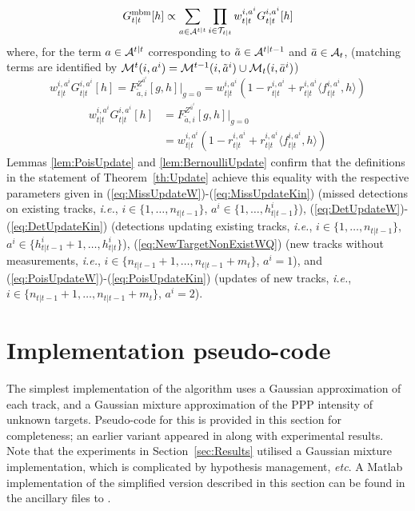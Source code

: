 \documentclass[journal,twoside]{IEEEtran}
\theoremstyle{plain}
\begin{document}
\begin{IEEEproof}
\begin{equation}
G^\mathrm{mbm}_{t|t}[h] \propto \sum_{a\in{\cal A}^{t|t}} \prod_{i\in{\cal T}_{t|t}}w^{i,a^i}_{t|t}G_{t|t}^{i,a^i}[h]
\end{equation}
%
where, for the term $a\in{\cal A}^{t|t}$ corresponding to $\tilde{a}\in{\cal A}^{t|t-1}$ and $\bar{a}\in{\cal A}_t$, (matching terms are identified by ${\cal M}^{t}(i,a^i)={\cal M}^{t-1}(i,\tilde{a}^i)\cup{\cal M}_t(i,\bar{a}^i)$)
%
\ifCLASSOPTIONdraftcls
\begin{equation}
w^{i,a^i}_{t|t}G_{t|t}^{i,a^i}[h] = F_{\tilde{a},i}^{Z^{\bar{a}^i}}[g,h]\bigg|_{g=0} 
= w_{t|t}^{i,a^i}(1-r^{i,a^i}_{t|t} + r^{i,a^i}_{t|t}\langle f^{i,a^i}_{t|t},h\rangle)
\end{equation}
\else
\begin{align}
w^{i,a^i}_{t|t}G_{t|t}^{i,a^i}[h] &= F_{\tilde{a},i}^{Z^{\bar{a}^i}}[g,h]\bigg|_{g=0} \\
&= w_{t|t}^{i,a^i}(1-r^{i,a^i}_{t|t} + r^{i,a^i}_{t|t}\langle f^{i,a^i}_{t|t},h\rangle)
\end{align}
\fi
%
Lemmas \ref{lem:PoisUpdate} and \ref{lem:BernoulliUpdate} confirm that the definitions in the statement of Theorem~\ref{th:Update} achieve this equality with the respective parameters given in (\ref{eq:MissUpdateW})-(\ref{eq:MissUpdateKin}) (missed detections on existing tracks, \textit{i.e.}\xspace, $i\in\{1,\dots,n_{t|t-1}\}$, $a^i\in\{1,\dots,h_{t|t-1}^i\}$), (\ref{eq:DetUpdateW})-(\ref{eq:DetUpdateKin}) (detections updating existing tracks, \textit{i.e.}\xspace, $i\in\{1,\dots,n_{t|t-1}\}$, $a^i\in\{h_{t|t-1}^i+1,\dots,h_{t|t}^i\}$), (\ref{eq:NewTargetNonExistWQ}) (new tracks without measurements, \textit{i.e.}\xspace, $i\in\{n_{t|t-1}+1,\dots,n_{t|t-1}+m_t\}$, $a^i=1$), and (\ref{eq:PoisUpdateW})-(\ref{eq:PoisUpdateKin}) (updates of new tracks, \textit{i.e.}\xspace, $i\in\{n_{t|t-1}+1,\dots,n_{t|t-1}+m_t\}$, $a^i=2$).
\end{IEEEproof}





\section{Implementation pseudo-code}
\label{app:Pseudocode}
%
{\noindent}The simplest implementation of the algorithm uses a Gaussian approximation of each track, and a Gaussian mixture approximation of the PPP intensity of unknown targets. Pseudo-code for this is provided in this section for completeness; an earlier variant appeared in \cite{Wil11b} along with experimental results. Note that the experiments in Section~\ref{sec:Results} utilised a Gaussian mixture implementation, which is complicated by hypothesis management, \textit{etc}\xspace. A Matlab implementation of the simplified version described in this section can be found in the ancillary files to \cite{Wil14c}.
\end{document}
